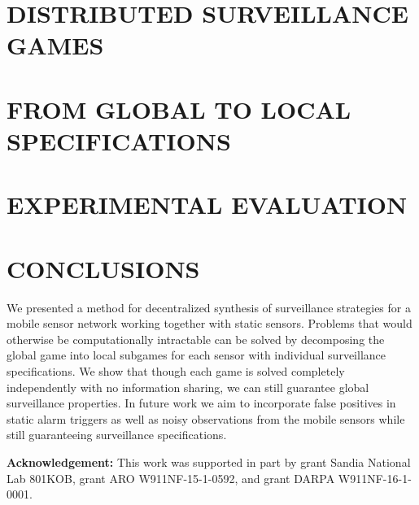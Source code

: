 \documentclass[letterpaper, 10 pt, conference]{ieeeconf}  %
\begin{document}



\section{DISTRIBUTED SURVEILLANCE GAMES}


\section{FROM GLOBAL TO LOCAL SPECIFICATIONS}

%
%

\section{EXPERIMENTAL EVALUATION}\label{sec:experiments}



\section{CONCLUSIONS}
We presented a method for decentralized synthesis of surveillance strategies for a mobile sensor network working together with static sensors. Problems that would otherwise be computationally intractable can be solved by decomposing the global game into local subgames for each sensor with individual surveillance specifications. We show that though each game is solved completely independently with no information sharing, we can still guarantee global surveillance properties.
In future work we aim to incorporate false positives in static alarm triggers as well as noisy observations from the mobile sensors while still guaranteeing surveillance specifications.

{\bf Acknowledgement:} This work was supported in part by grant Sandia National Lab 801KOB, grant ARO W911NF-15-1-0592,  and grant DARPA W911NF-16-1-0001.









\end{document}
